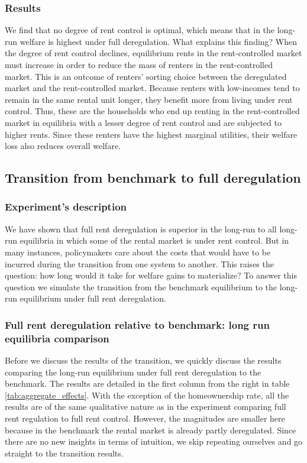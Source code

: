 \documentclass[parskip=full]{article}
\begin{document}
\subsubsection{Results} We find that no degree of rent control is optimal, which means that in the long-run welfare is highest under full deregulation. What explains this finding? When the degree of rent control declines, equilibrium rents in the rent-controlled market must increase in order to reduce the mass of renters in the rent-controlled market. This is an outcome of renters' sorting choice between the deregulated market and the rent-controlled market. Because renters with low-incomes tend to remain in the same rental unit longer, they benefit more from living under rent control. Thus, these are the households who end up renting in the rent-controlled market in equilibria with a lesser degree of rent control and are subjected to higher rents. Since these renters have the highest marginal utilities, their welfare loss also reduces overall welfare. 

\subsection{Transition from benchmark to full deregulation}

\subsubsection{Experiment's description} We have shown that full rent deregulation is superior in the long-run to all long-run equilibria in which some of the rental market is under rent control. But in many instances, policymakers care about the costs that would have to be incurred during the transition from one system to another. This raises the question: how long would it take for welfare gains to materialize? To answer this question we simulate the transition from the benchmark equilibrium to the long-run equilibrium under full rent deregulation.

\subsubsection{Full rent deregulation relative to benchmark: long run equilibria comparison} Before we discuss the results of the transition, we quickly discuss the results comparing the long-run equilibrium under full rent deregulation to the benchmark. The results are detailed in the first column from the right in table \ref{tab:aggregate_effects}. With the exception of the homeownership rate, all the results are of the same qualitative nature as in the experiment comparing full rent regulation to full rent control. However, the magnitudes are smaller here because in the benchmark the rental market is already partly deregulated. Since there are no new insights in terms of intuition, we skip repeating ourselves and go straight to the transition results.
\end{document}
